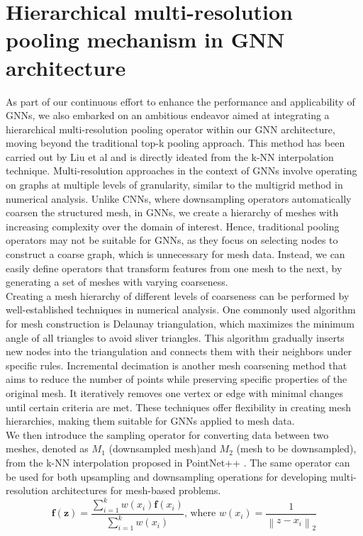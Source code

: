 \section{Hierarchical multi-resolution pooling mechanism in GNN architecture}
As part of our continuous effort to enhance the performance and applicability of GNNs, we also embarked on an ambitious endeavor aimed at integrating a hierarchical multi-resolution pooling operator within our GNN architecture, moving beyond the traditional top-k pooling approach. This method has been carried out by Liu et al \cite{metalearning} and is directly ideated from the k-NN interpolation technique. 
Multi-resolution approaches in the context of GNNs involve operating on graphs at multiple levels of granularity, similar to the multigrid method in numerical analysis. Unlike CNNs, where downsampling operators automatically coarsen the structured mesh, in GNNs, we create a hierarchy of meshes with increasing complexity over the domain of interest. Hence, traditional pooling operators may not be suitable for GNNs, as they focus on selecting nodes to construct a coarse graph, which is unnecessary for mesh data. Instead, we can easily define operators that transform features from one mesh to the next, by generating a set of meshes with varying coarseness.\\
Creating a mesh hierarchy of different levels of coarseness can be performed by well-established techniques in numerical analysis. One commonly used algorithm for mesh construction is Delaunay triangulation, which maximizes the minimum angle of all triangles to avoid sliver triangles. This algorithm gradually inserts new nodes into the triangulation and connects them with their neighbors under specific rules. Incremental decimation is another mesh coarsening method that aims to reduce the number of points while preserving specific properties of the original mesh. It iteratively removes one vertex or edge with minimal changes until certain criteria are met. These techniques offer flexibility in creating mesh hierarchies, making them suitable for GNNs applied to mesh data.\\
We then introduce the sampling operator for converting data between two meshes, denoted as $M_1$ (downsampled mesh)and $M_2$ (mesh to be downsampled), from the k-NN interpolation proposed in PointNet++ \cite{pnpp}. The same operator can be used for both upsampling and downsampling operations for developing multi-resolution architectures for mesh-based problems. \\
\begin{equation}
    \mathbf{f}(\mathbf{z})=\frac{\sum_{i=1}^k w\left(x_i\right) \mathbf{f}\left(x_i\right)}{\sum_{i=1}^k w\left(x_i\right)} \text {, where } w\left(x_i\right)=\frac{1}{\left\|z-x_i\right\|_2}
    \end{equation}
